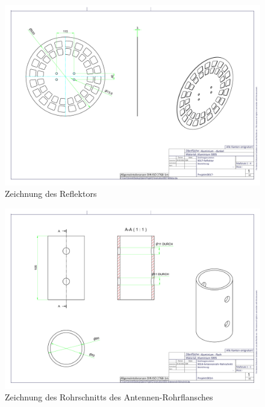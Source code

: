 	\begin{figure}[h!]
	\includegraphics[angle=90,width=\textwidth]{../ref/0017-Reflektor.pdf}
	\caption{Zeichnung des Reflektors}
	\label{fig:Reflektor-Zeichnung}
\end{figure}

	\begin{figure}[h!]
	\includegraphics[angle=90,width=\textwidth]{../ref/0014-Antennenrohr-Rohrschnitt.pdf}
	\caption{Zeichnung des Rohrschnitts des Antennen-Rohrflansches}
	\label{fig:Rohrschnitt-Rohrflansch-Antenne}
\end{figure}

